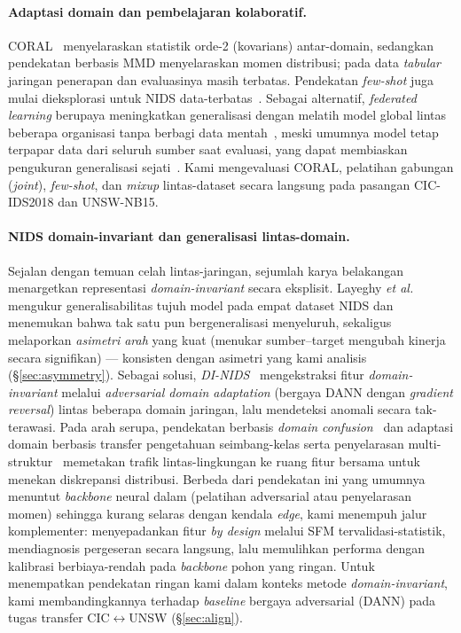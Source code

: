 \documentclass[11pt,a4paper]{article}
\begin{document}
\paragraph{Adaptasi domain dan pembelajaran kolaboratif.} CORAL~\cite{coral}
menyelaraskan statistik orde-2 (kovarians) antar-domain, sedangkan pendekatan
berbasis MMD menyelaraskan momen distribusi; pada data \emph{tabular} jaringan
penerapan dan evaluasinya masih terbatas. Pendekatan \emph{few-shot} juga mulai
dieksplorasi untuk NIDS data-terbatas~\cite{fewshot}. Sebagai alternatif,
\emph{federated learning} berupaya meningkatkan generalisasi dengan melatih model
global lintas beberapa organisasi tanpa berbagi data
mentah~\cite{nidsfgpa,popoola,bertoli,agrawal}, meski
umumnya model tetap terpapar data dari seluruh sumber saat evaluasi, yang dapat
membiaskan pengukuran generalisasi sejati~\cite{cantone}. Kami mengevaluasi CORAL,
pelatihan gabungan (\emph{joint}), \emph{few-shot}, dan \emph{mixup}
lintas-dataset secara langsung pada pasangan CIC-IDS2018 dan UNSW-NB15.

\paragraph{NIDS domain-invariant dan generalisasi lintas-domain.} Sejalan dengan
temuan celah lintas-jaringan, sejumlah karya belakangan menargetkan representasi
\emph{domain-invariant} secara eksplisit. Layeghy \emph{et al.}~\cite{digeneralis}
mengukur generalisabilitas tujuh model pada empat dataset NIDS dan menemukan bahwa
tak satu pun bergeneralisasi menyeluruh, sekaligus melaporkan \emph{asimetri arah}
yang kuat (menukar sumber--target mengubah kinerja secara signifikan) --- konsisten
dengan asimetri yang kami analisis (\S\ref{sec:asymmetry}). Sebagai solusi,
\emph{DI-NIDS}~\cite{dinids} mengekstraksi fitur \emph{domain-invariant} melalui
\emph{adversarial domain adaptation} (bergaya DANN dengan \emph{gradient reversal})
lintas beberapa domain jaringan, lalu mendeteksi anomali secara tak-terawasi. Pada
arah serupa, pendekatan berbasis \emph{domain confusion}~\cite{domconf} dan
adaptasi domain berbasis transfer pengetahuan seimbang-kelas serta penyelarasan
multi-struktur~\cite{classbal} memetakan trafik lintas-lingkungan ke ruang fitur
bersama untuk menekan diskrepansi distribusi. Berbeda dari pendekatan ini yang
umumnya menuntut \emph{backbone} neural dalam (pelatihan adversarial atau
penyelarasan momen) sehingga kurang selaras dengan kendala \emph{edge}, kami
menempuh jalur komplementer: menyepadankan fitur \emph{by design} melalui SFM
tervalidasi-statistik, mendiagnosis pergeseran secara langsung, lalu memulihkan
performa dengan kalibrasi berbiaya-rendah pada \emph{backbone} pohon yang ringan.
Untuk menempatkan pendekatan ringan kami dalam konteks metode
\emph{domain-invariant}, kami membandingkannya terhadap \emph{baseline} bergaya
adversarial (DANN) pada tugas transfer CIC$\leftrightarrow$UNSW
(\S\ref{sec:align}).
\ifadversarial
\end{document}
